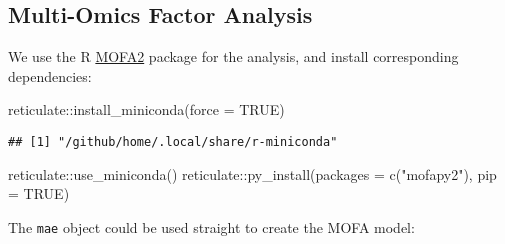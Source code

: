 \documentclass[
  oneside]{book}
\newenvironment{Shaded}{\begin{snugshade}}{\end{snugshade}}
\newcommand{\AttributeTok}[1]{\textcolor[rgb]{0.77,0.63,0.00}{#1}}
\newcommand{\ConstantTok}[1]{\textcolor[rgb]{0.00,0.00,0.00}{#1}}
\newcommand{\FunctionTok}[1]{\textcolor[rgb]{0.00,0.00,0.00}{#1}}
\newcommand{\NormalTok}[1]{#1}
\newcommand{\SpecialCharTok}[1]{\textcolor[rgb]{0.00,0.00,0.00}{#1}}
\newcommand{\StringTok}[1]{\textcolor[rgb]{0.31,0.60,0.02}{#1}}
\begin{document}
\hypertarget{multi-omics-factor-analysis}{%
\subsection{Multi-Omics Factor Analysis}\label{multi-omics-factor-analysis}}

We use the R \href{https://biofam.github.io/MOFA2/installation.html}{MOFA2} package
for the analysis, and install corresponding dependencies:

\begin{Shaded}
\begin{Highlighting}[]
\NormalTok{reticulate}\SpecialCharTok{::}\FunctionTok{install\_miniconda}\NormalTok{(}\AttributeTok{force =} \ConstantTok{TRUE}\NormalTok{)}
\end{Highlighting}
\end{Shaded}

\begin{verbatim}
## [1] "/github/home/.local/share/r-miniconda"
\end{verbatim}

\begin{Shaded}
\begin{Highlighting}[]
\NormalTok{reticulate}\SpecialCharTok{::}\FunctionTok{use\_miniconda}\NormalTok{()}
\NormalTok{reticulate}\SpecialCharTok{::}\FunctionTok{py\_install}\NormalTok{(}\AttributeTok{packages =} \FunctionTok{c}\NormalTok{(}\StringTok{"mofapy2"}\NormalTok{), }\AttributeTok{pip =} \ConstantTok{TRUE}\NormalTok{)}
\end{Highlighting}
\end{Shaded}

The \texttt{mae} object could be used straight to create the MOFA model:
\end{document}
